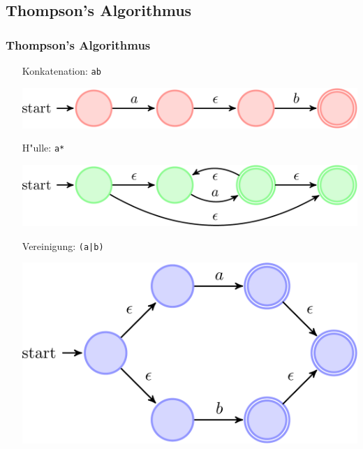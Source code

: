 \documentclass[ignorenonframetext]{beamer}
\begin{document}
\subsection{Thompson's Algorithmus}
\begin{frame}
    \frametitle{Thompson's Algorithmus}
	
	\begin{itemize}
		\item[{\color{red}Konkatenation: \texttt{ab}}]
\begin{center}\includegraphics[scale=0.22]{ab.pdf}\end{center}
		\item[]
		\item[{\color{green}H"ulle: \texttt{a*}}]
\begin{center}\includegraphics[scale=0.22]{astar.pdf}\end{center}
		\item[]
		\item[{\color{blue}Vereinigung: \texttt{(a|b)}}]
\begin{center}\includegraphics[scale=0.22]{aorb.pdf}\end{center}
	\end{itemize}
\end{frame}
\end{document}
